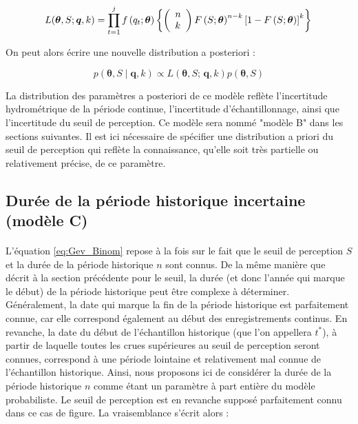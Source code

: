 				\begin{equation}
				L(\boldsymbol{\theta}, S ; \boldsymbol{q}, k) =\prod_{t=1}^j f\left(q_t;\boldsymbol{\theta}\right) \left\{\left(\begin{array}{l}
				n \\
				k
				\end{array}\right) F\left(S;\boldsymbol{\theta}\right)^{n-k}\left[1-F\left(S;\boldsymbol{\theta}\right)\right]^k\right\} \\
				\label{eq:Gev_Binom_uS}
				\end{equation}
				
		On peut alors écrire une nouvelle distribution a posteriori : 			
				
				\begin{equation}
					p(\boldsymbol{\theta}, S \mid \boldsymbol{q},k) \propto L(\boldsymbol{\theta},S;\,\boldsymbol{q},k) p(\boldsymbol{\theta},S)
					\label{eq:Bayes_uS}
				\end{equation}
			
		La distribution des paramètres a posteriori de ce modèle reflète l'incertitude hydrométrique de la période continue, l'incertitude d'échantillonnage, ainsi que l'incertitude du seuil de perception. Ce modèle sera nommé "modèle B" dans les sections suivantes. Il est ici nécessaire de spécifier une distribution a priori du seuil de perception qui reflète la connaissance, qu'elle soit très partielle ou relativement précise, de ce paramètre. 

	\subsection{Durée de la période historique incertaine (modèle C)}
	\label{subsec:modC}
	
		\paragraph{}
		L'équation \ref{eq:Gev_Binom} repose à la fois sur le fait que le seuil de perception $S$ et la durée de la période historique $n$ sont connus. De la même manière que décrit à la section précédente pour le seuil, la durée (et donc l'année qui marque le début) de la période historique peut être complexe à déterminer. Généralement, la date qui marque la fin de la période historique est parfaitement connue, car elle correspond également au début des enregistrements continus. En revanche, la date du début de l'échantillon historique (que l'on appellera $t^{*}$), à partir de laquelle toutes les crues supérieures au seuil de perception seront connues, correspond à une période lointaine et relativement mal connue de l'échantillon historique. Ainsi, nous proposons ici de considérer la durée de la période historique $n$ comme étant un paramètre à part entière du modèle probabiliste. Le seuil de perception est en revanche supposé parfaitement connu dans ce cas de figure. La vraisemblance s'écrit alors : 
		 
